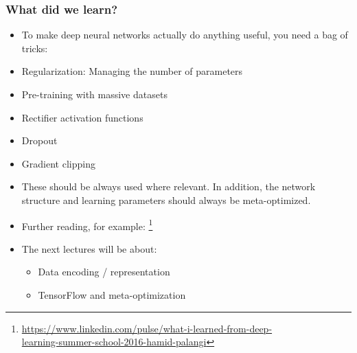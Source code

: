 \documentclass[8pt]{beamer}
\begin{document}
\begin{frame}
\frametitle{What did we learn?}
 \begin{itemize}
  \item To make deep neural networks actually do anything useful, you need a bag of tricks:
  \item Regularization: Managing the number of parameters
  \item Pre-training with massive datasets
  \item Rectifier activation functions
  \item Dropout
  \item Gradient clipping
  \item These should be always used where relevant. In addition, the network structure and learning parameters should always be meta-optimized.
  \item Further reading, for example:
        \footnote{\href{https://www.linkedin.com/pulse/what-i-learned-from-deep-learning-summer-school-2016-hamid-palangi}
        {https://www.linkedin.com/pulse/what-i-learned-from-deep-\\learning-summer-school-2016-hamid-palangi}}
  \item The next lectures will be about:
  \begin{itemize}
    \item Data encoding / representation
    \item TensorFlow and meta-optimization
  \end{itemize}
 \end{itemize}
\end{frame}
\end{document}
